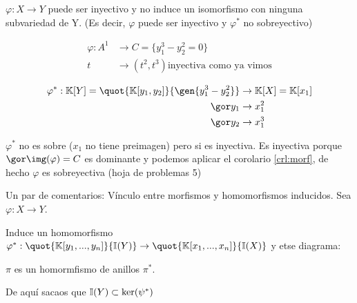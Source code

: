 \obs $\varphi: X \rightarrow Y$ puede ser inyectivo y no induce un isomorfismo con ninguna subvariedad de Y. (Es decir, $\varphi$ puede ser inyectivo y $\varphi^*$ no sobreyectivo)

\begin{example}

	\begin{align*}
		\varphi: A^1 & \rightarrow C=\{ y_1^3-y_2^2=0 \} \\
		t & \rightarrow (t^2,t^3) \text{inyectiva como ya vimos}
	\end{align*}

	\begin{align*}
		\varphi^*: \K[Y]=\quot{\K[y_1,y_2]}{\gen{y_1^3-y_2^2}} & \rightarrow \K[X]=\K[x_1] \\
		\cls{y_1} & \rightarrow x_1^2 \\
		\cls{y_2} & \rightarrow x_1^3
	\end{align*}

	$\varphi^*$ no es sobre ($x_1$ no tiene preimagen) pero si es inyectiva. Es inyectiva porque $\cls{\img(\varphi)}=C$  es dominante y podemos aplicar el corolario \ref{crl:morf}, de hecho $\varphi$ es sobreyectiva (hoja de problemas 5)
\end{example}

Un par de comentarios:
Vínculo entre morfismos y homomorfismos inducidos. Sea $\varphi:X \rightarrow Y$.

Induce un homomorfismo $\varphi^*: \quot{\K[y_1,...,y_n]}{\I(Y)} \rightarrow \quot{\K[x_1,...,x_n]}{\I(X)}$ y etse diagrama:


$\pi$ es un homormfismo de anillos $\pi^*$.

De aquí sacaos que $\mathbb{I}(Y) \subset \ker(\psi^*)$


